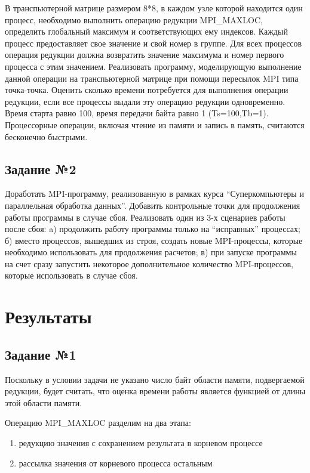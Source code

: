 \documentclass[a4paper]{article}
\begin{document}
В транспьютерной матрице размером 8*8, в каждом узле которой находится один процесс, необходимо выполнить операцию редукции MPI\_MAXLOC, определить глобальный максимум и соответствующих ему индексов. Каждый процесс предоставляет свое значение и свой номер в группе. Для всех процессов операция редукции должна возвратить значение максимума и номер первого процесса с этим значением.
Реализовать программу, моделирующую выполнение данной операции на транспьютерной матрице при помощи пересылок MPI типа точка-точка.
Оценить сколько времени потребуется для выполнения операции редукции, если все процессы выдали эту операцию редукции одновременно. Время старта равно 100, время передачи байта равно 1 (Ts=100,Tb=1). Процессорные операции, включая чтение из памяти и запись в память, считаются бесконечно быстрыми.

\subsection{Задание №2}

Доработать MPI-программу, реализованную в рамках курса “Суперкомпьютеры и параллельная обработка данных”. Добавить контрольные точки для продолжения работы программы в случае сбоя. Реализовать один из 3-х сценариев работы после сбоя: a) продолжить работу программы только на “исправных” процессах; б) вместо процессов, вышедших из строя, создать новые MPI-процессы, которые необходимо использовать для продолжения расчетов; в) при запуске программы на счет сразу запустить некоторое дополнительное количество MPI-процессов, которые использовать в случае сбоя.

\newpage

\section{Результаты}
\subsection{Задание №1}

Поскольку в условии задачи не указано число байт области памяти, подвергаемой редукции, будет считать, что оценка времени работы является функцией от длины этой области памяти. 

Операцию MPI\_MAXLOC разделим на два этапа: 
\begin{enumerate}
    \item редукцию значения с сохранением результата в корневом процессе
    \item рассылка значения от корневого процесса остальным
\end{enumerate}
\end{document}
